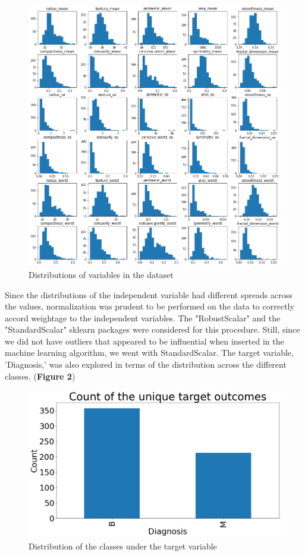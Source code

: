 \documentclass[10pt,twocolumn,letterpaper]{article}
\begin{document}
\begin{figure}
    \centering
    \includegraphics[width=\linewidth, height=\textheight,keepaspectratio]{Images/output.png}
    \caption{Distributions of variables in the dataset}
    \label{fig:my_label}
\end{figure}

Since the distributions of the independent variable had different spreads across the values, normalization was prudent to be performed on the data to correctly accord weightage to the independent variables. The "RobustScalar" and the "StandardScalar" sklearn packages were considered for this procedure. Still, since we did not have outliers that appeared to be influential when inserted in the machine learning algorithm, we went with StandardScalar. The target variable, 'Diagnosis,' was also explored in terms of the distribution across the different classes. (\textbf{Figure 2})

\begin{figure}
    \centering
    \includegraphics[width=\linewidth, height=\textheight,keepaspectratio]{Images/output1.png}
    \caption{Distribution of the classes under the target variable}
    \label{fig:my_label}
\end{figure}
\end{document}
